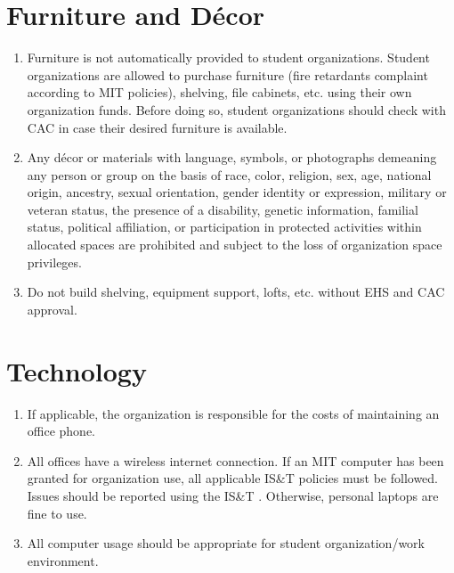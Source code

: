 \documentclass[12pt]{constitution}
\begin{document}
\section{Furniture and D\'{e}cor}
\begin{enumerate}
    \item Furniture is not automatically provided to student organizations.
    Student organizations are allowed to purchase furniture (fire retardants complaint according to MIT policies),
        shelving, file cabinets, etc. using their own organization funds.
    Before doing so, student organizations should check with CAC in case their desired furniture is available.

    \item Any d\'{e}cor or materials with language, symbols, or photographs demeaning any person or group
        on the basis of race, color, religion, sex, age, national origin, ancestry, sexual orientation,
        gender identity or expression, military or veteran status, the presence of a disability,
        genetic information, familial status, political affiliation, or participation in protected activities
        within allocated spaces are prohibited and subject to the loss of organization space privileges.
    
    \item Do not build shelving, equipment support, lofts, etc. without EHS and CAC approval.
\end{enumerate}

\section{Technology}
\begin{enumerate}
    \item If applicable, the organization is responsible for the costs of maintaining an office phone.
    
    \item All offices have a wireless internet connection.
    If an MIT computer has been granted for organization use, all applicable IS\&T policies must be followed.
    Issues should be reported using the IS\&T .
    Otherwise, personal laptops are fine to use.

    \item All computer usage should be appropriate for student organization/work environment. 
\end{enumerate}
\end{document}
